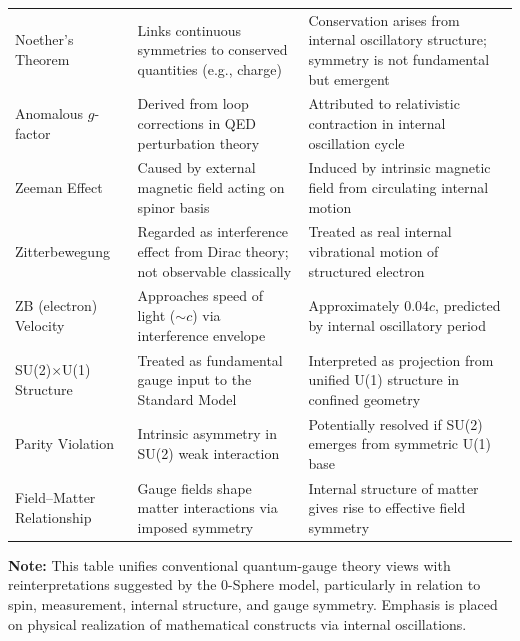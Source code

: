 \documentclass[%
 reprint,
 amsmath,amssymb,
 aps,
]{revtex4-1}
\numberwithin{equation}{section}%
\begin{document}
\begin{table}[t!]
\begin{tabular}{p{4.8cm}p{6.2cm}p{6.2cm}}
\addlinespace[0.3cm]
Noether’s Theorem & Links continuous symmetries to conserved quantities (e.g., charge) & Conservation arises from internal oscillatory structure; symmetry is not fundamental but emergent \\
\addlinespace[0.3cm]
Anomalous $g$-factor & Derived from loop corrections in QED perturbation theory & Attributed to relativistic contraction in internal oscillation cycle \\
\addlinespace[0.3cm]
Zeeman Effect & Caused by external magnetic field acting on spinor basis & Induced by intrinsic magnetic field from circulating internal motion \\
\addlinespace[0.3cm]
Zitterbewegung & Regarded as interference effect from Dirac theory; not observable classically & Treated as real internal vibrational motion of structured electron \\
\addlinespace[0.3cm]
ZB (electron) Velocity & Approaches speed of light ($\sim c$) via interference envelope & Approximately $0.04c$, predicted by internal oscillatory period \\
\addlinespace[0.3cm]
SU(2)$\times$U(1) Structure & Treated as fundamental gauge input to the Standard Model & Interpreted as projection from unified U(1) structure in confined geometry \\
\addlinespace[0.3cm]
Parity Violation & Intrinsic asymmetry in SU(2) weak interaction & Potentially resolved if SU(2) emerges from symmetric U(1) base \\
\addlinespace[0.3cm]
Field–Matter Relationship & Gauge fields shape matter interactions via imposed symmetry & Internal structure of matter gives rise to effective field symmetry \\
\bottomrule
\end{tabular}
\vspace{0.2cm}
\begin{flushleft}
\footnotesize
\textbf{Note:} This table unifies conventional quantum-gauge theory views with reinterpretations suggested by the 0-Sphere model, particularly in relation to spin, measurement, internal structure, and gauge symmetry. Emphasis is placed on physical realization of mathematical constructs via internal oscillations.
\end{flushleft}
\end{table}

\vfill  %
\clearpage  %


\end{document}
